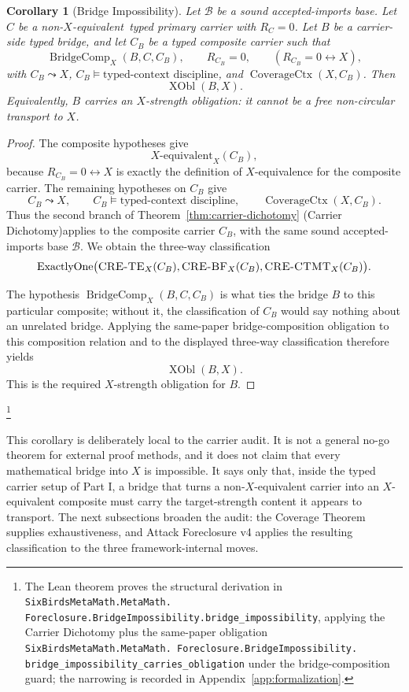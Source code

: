 \documentclass[11pt]{article}
\newcommand{\Xequiv}{$X$-equivalent}
\newcommand{\nonXequiv}{non-$X$-equivalent}
\newcommand{\CRETE}{\textsc{CRE-TE}}
\newcommand{\CREBF}{\textsc{CRE-BF}}
\newcommand{\CRECTMT}{\textsc{CRE-CTMT}}
\newcommand{\XstrengthObl}{$X$-strength obligation}
\newcommand{\thmCarrierDichotomy}{Theorem~\ref{thm:carrier-dichotomy} (Carrier Dichotomy)}
\newcommand{\TCD}{typed-context discipline}
\newtheorem{corollary}[theorem]{Corollary}
\theoremstyle{definition}
\begin{document}
\begin{corollary}[Bridge Impossibility]\label{cor:bridge-impossibility}
Let \(\mathcal B\) be a sound accepted-imports base.  Let \(C\) be a
\nonXequiv\ typed primary carrier with \(R_C=0\).  Let \(B\) be a
carrier-side typed bridge, and let \(C_B\) be a typed composite carrier
such that
\[
  \operatorname{BridgeComp}_X(B,C,C_B),\qquad
  R_{C_B}=0,\qquad
  (R_{C_B}=0\leftrightarrow X),
\]
with \(C_B\leadsto X\), \(C_B\models\text{\TCD}\), and
\(\operatorname{CoverageCtx}(X,C_B)\).  Then
\[
  \operatorname{XObl}(B,X).
\]
Equivalently, \(B\) carries an \XstrengthObl: it cannot be a free
non-circular transport to \(X\).
\end{corollary}

\begin{proof}
The composite hypotheses give
\[
  \mbox{\Xequiv}_X(C_B),
\]
because \(R_{C_B}=0\leftrightarrow X\) is exactly the definition of
\(X\)-equivalence for the composite carrier.  The remaining hypotheses
on \(C_B\) give
\[
  C_B\leadsto X,\qquad C_B\models\text{\TCD},\qquad
  \operatorname{CoverageCtx}(X,C_B).
\]
Thus the second branch of \thmCarrierDichotomy applies to the composite
carrier \(C_B\), with the same sound accepted-imports base
\(\mathcal B\).  We obtain the three-way classification
\[
  \operatorname{ExactlyOne}\bigl(
    \mbox{\CRETE}_X(C_B),\mbox{\CREBF}_X(C_B),\mbox{\CRECTMT}_X(C_B)
  \bigr).
\]

The hypothesis \(\operatorname{BridgeComp}_X(B,C,C_B)\) is what ties
the bridge \(B\) to this particular composite; without it, the
classification of \(C_B\) would say nothing about an unrelated bridge.
Applying the same-paper bridge-composition obligation to this
composition relation and to the displayed three-way classification
therefore yields
\[
  \operatorname{XObl}(B,X).
\]
This is the required \(X\)-strength obligation for \(B\).
\end{proof}\footnote{\raggedright The Lean theorem proves the structural
derivation in \texttt{SixBirdsMetaMath.MetaMath.\allowbreak
Foreclosure.BridgeImpossibility.\allowbreak bridge\_impossibility},
applying the Carrier Dichotomy plus the same-paper obligation
\texttt{SixBirdsMetaMath.MetaMath.\allowbreak
Foreclosure.BridgeImpossibility.\allowbreak
bridge\_impossibility\_carries\_obligation} under the
bridge-composition guard; the narrowing is recorded in
Appendix~\ref{app:formalization}.}

This corollary is deliberately local to the carrier audit.  It is not a
general no-go theorem for external proof methods, and it does not claim
that every mathematical bridge into \(X\) is impossible.  It says only
that, inside the typed carrier setup of Part I, a bridge that turns a
non-\(X\)-equivalent carrier into an \(X\)-equivalent composite must
carry the target-strength content it appears to transport.  The next
subsections broaden the audit: the Coverage Theorem supplies
exhaustiveness, and Attack Foreclosure v4 applies the resulting
classification to the three framework-internal moves.
\end{document}
